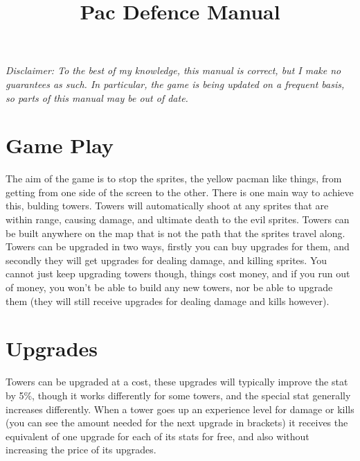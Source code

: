 \documentclass[a4paper,11pt]{article}
\title{Pac Defence Manual}
\begin{document}
\maketitle

\begin{center}
\begin{minipage}{12cm}
\begin{small}
\it
Disclaimer: To the best of my knowledge, this manual is correct, but I make no guarantees as such. In particular, the game is being updated on a frequent basis, so parts of this manual may be out of date.
\end{small}
\end{minipage}
\end{center}

\tableofcontents
\pagebreak

\setlength{\parskip}{4mm plus 2mm minus 1 mm}

\section{Game Play}
The aim of the game is to stop the sprites, the yellow pacman like things, from getting from one side of the screen to the other. There is one main way to achieve this, bulding towers. Towers will automatically shoot at any sprites that are within range, causing damage, and ultimate death to the evil sprites. Towers can be built anywhere on the map that is not the path that the sprites travel along. Towers can be upgraded in two ways, firstly you can buy upgrades for them, and secondly they will get upgrades for dealing damage, and killing sprites. You cannot just keep upgrading towers though, things cost money, and if you run out of money, you won't be able to build any new towers, nor be able to upgrade them (they will still receive upgrades for dealing damage and kills however).

\section{Upgrades}
Towers can be upgraded at a cost, these upgrades will typically improve the stat by 5\%, though it works differently for some towers, and the special stat generally increases differently. When a tower goes up an experience level for damage or kills (you can see the amount needed for the next upgrade in brackets) it receives the equivalent of one upgrade for each of its stats for free, and also without increasing the price of its upgrades.
\end{document}
